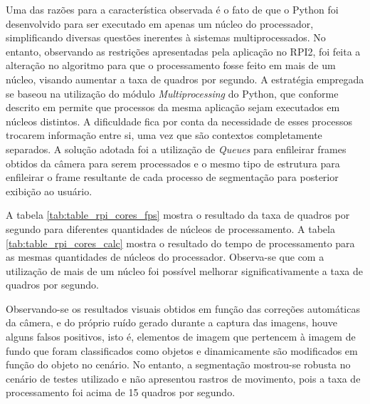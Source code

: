 \documentclass[conference]{IEEEtran}
\begin{document}

Uma das razões para a característica observada é o fato de que o Python foi desenvolvido para ser executado em apenas um núcleo do processador, simplificando diversas questões inerentes à sistemas multiprocessados. No entanto, observando as restrições apresentadas pela aplicação no RPI2, foi feita a alteração no algoritmo para que o processamento fosse feito em mais de um núcleo, visando aumentar a taxa de quadros por segundo. A estratégia empregada se baseou na utilização do módulo \textit{Multiprocessing} do Python, que conforme descrito em \cite{IEEEhowto:micha} permite que processos da mesma aplicação sejam executados em núcleos distintos. A dificuldade fica por conta da necessidade de esses processos trocarem informação entre si, uma vez que são contextos completamente separados. A solução adotada foi a utilização de \textit{Queues} para enfileirar frames obtidos da câmera para serem processados e o mesmo tipo de estrutura para enfileirar o frame resultante de cada processo de segmentação para posterior exibição ao usuário. 

A tabela \ref{tab:table_rpi_cores_fps} mostra o resultado da taxa de quadros por segundo para diferentes quantidades de núcleos de processamento. A tabela \ref{tab:table_rpi_cores_calc} mostra o resultado do tempo de processamento para as mesmas quantidades de núcleos do processador. Observa-se que com a utilização de mais de um núcleo foi possível melhorar significativamente a taxa de quadros por segundo.

Observando-se os resultados visuais obtidos em função das correções automáticas da câmera, e do próprio ruído gerado durante a captura das imagens, houve alguns falsos positivos, isto é, elementos de imagem que pertencem à imagem de fundo que foram classificados como objetos e dinamicamente são modificados em função do objeto no cenário. No entanto, a segmentação mostrou-se robusta no cenário de testes utilizado e não apresentou rastros de movimento, pois a taxa de processamento foi acima de 15 quadros por segundo.
\end{document}
